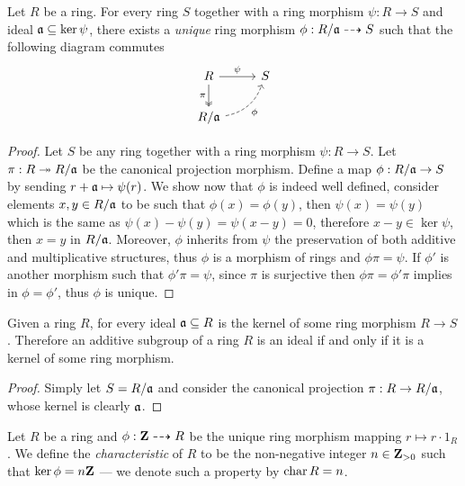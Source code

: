 \begin{proposition}
\label{prop:universal-property-quotienting-rings}
Let \(R\) be a ring. For every ring \(S\) together with a ring morphism \(\psi:
R \to S\) and ideal \(\mathfrak{a} \subseteq \ker \psi\), there exists a
\emph{unique} ring morphism \(\phi: R/\mathfrak{a} \dashrightarrow S\) such that the
following diagram commutes
\[
\begin{tikzcd}
R \ar[r, "\psi"] \ar[d, swap, "\pi", two heads] &S \\
R/\ideal{a} \ar[ru, bend right, swap, "\phi", dashed] &
\end{tikzcd}
\]
\end{proposition}

\begin{proof}
Let \(S\) be any ring together with a ring morphism \(\psi: R \to S\). Let
\(\pi: R \twoheadrightarrow R/\mathfrak{a}\) be the canonical projection morphism. Define a map
\(\phi: R/\mathfrak{a} \to S\) by sending \(r + \mathfrak{a} \mapsto \psi(r)\). We
show now that \(\phi\) is indeed well defined, consider elements
\(x, y \in R/\mathfrak{a}\) to be such that \(\phi(x) = \phi(y)\), then
\(\psi(x) = \psi(y)\) which is the same as
\(\psi(x) - \psi(y) = \psi(x - y) = 0\), therefore \(x - y \in \ker \psi\), then
\(x = y\) in \(R/\mathfrak{a}\). Moreover, \(\phi\) inherits from \(\psi\) the
preservation of both additive and multiplicative structures, thus \(\phi\) is a
morphism of rings and \(\phi \pi = \psi\). If \(\phi'\) is another morphism such
that \(\phi' \pi = \psi\), since \(\pi\) is surjective then \(\phi \pi = \phi'
\pi\) implies in \(\phi = \phi'\), thus \(\phi\) is unique.
\end{proof}

\begin{corollary}
\label{cor:ideal-is-kernel}
Given a ring \(R\), for every ideal \(\mathfrak{a} \subseteq R\) is the kernel of
some ring morphism \(R \to S\). Therefore an additive subgroup of a ring \(R\)
is an ideal if and only if it is a kernel of some ring morphism.
\end{corollary}

\begin{proof}
Simply let \(S = R/\mathfrak{a}\) and consider the canonical projection \(\pi: R
\to R/\mathfrak{a}\), whose kernel is clearly \(\mathfrak{a}\).
\end{proof}

\begin{definition}[Characteristic]
\label{def:ring-characteristic}
Let \(R\) be a ring and \(\phi: \mathbf{Z} \dashrightarrow R\) be the unique ring morphism
mapping \(r \mapsto r \cdot 1_R\). We define the \emph{characteristic} of \(R\)
to be the non-negative integer \(n \in \mathbf{Z}_{> 0}\) such that \(\ker \phi = n \mathbf{Z}\)
--- we denote such a property by \(\operatorname{char} R = n\).
\end{definition}


